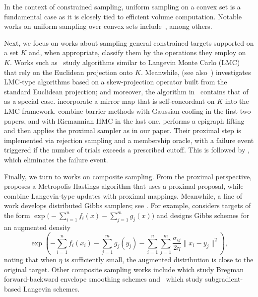 \documentclass[11pt,letterpaper]{article}
\begin{document}
In the context of constrained sampling, uniform sampling on a convex set is a fundamental case as it is closely tied to efficient volume computation. Notable works on uniform sampling over convex sets include~\cite{kook2024inandout,diaconis2012gibbs,narayanan2022mixing,laddha2023convergence,lovasz1999hit,cheneldanhitandrun,chen2018fast,kannan2009random}, among others.



Next, we focus on works about sampling general constrained targets supported on a set $K$ and, when appropriate, classify them by the operations they employ on $K$. Works such as~\cite{brosse2017sampling,lamperski2021projected,durmus2018efficient,Bubeck2018} study algorithms similar to Langevin Monte Carlo (LMC) that rely on the Euclidean projection onto $K$. Meanwhile, \cite{du2025non} (see also~\cite{wang2025accelerating}) investigates LMC-type algorithms based on a skew-projection operator built from the standard Euclidean projection; and moreover, the algorithm in~\cite{du2025non} contains that of~\cite{Bubeck2018} as a special case. \cite{ahn2021efficient,srinivasan2024fast,hsieh2018mirrored,zhang2020wasserstein,li2022mirror,jiang2021mirror} incorporate a mirror map that is self-concordant on $K$ into the LMC framework. \cite{kook2024gaussian,cousins2018gaussian,kook2022sampling} combine barrier methods with Gaussian cooling in the first two papers, and with Riemannian HMC in the last one. \cite{kook2025algodiffusion} performs a epigraph lifting and then applies the proximal sampler as in our paper. Their proximal step is implemented via rejection sampling and a membership oracle, with a failure event triggered if the number of trials exceeds a prescribed cutoff. This is followed by \cite{kook2025zeroth}, which eliminates the failure event.




Finally, we turn to works on composite sampling. From the proximal perspective, \cite{mou2022composite} proposes a Metropolis-Hastings algorithm that uses a proximal proposal, while \cite{salim2019proximal,lau2022bregman,pereyra2016proximal,ehrhardt2024proximal} combine Langevin-type updates with proximal mappings. Meanwhile, a line of work develops distributed Gibbs samplers; see \cite{yuan2023class,vono2022admm,vono2019admm,rendell2020global}. For example, \cite{yuan2023class} considers targets of the form $\exp\!\big(-\sum_{i=1}^n f_i(x)-\sum_{j=1}^m g_j(x)\big)$ and designs Gibbs schemes for an augmented density
\[
\exp\!\left(-\sum_{i=1}^n f_i(x_i)-\sum_{j=1}^m g_j(y_j)-\sum_{i=1}^n\sum_{j=1}^m\frac{\sigma_{ij}}{2\eta}\|x_i-y_j\|^2\right),
\]
noting that when $\eta$ is sufficiently small, the augmented distribution is close to the original target. Other composite sampling works include \cite{eftekhari2023forward,ghaderi2024smoothing} which study Bregman forward-backward envelope smoothing schemes  and~\cite{habring2024subgradient} which study subgradient-based Langevin schemes. 
\end{document}
